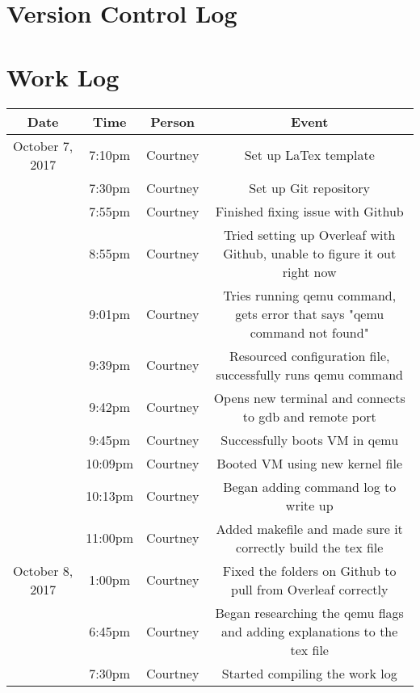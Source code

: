 \documentclass[letterpaper,10pt,draftclsnofoot,onecolumn,titlepage]{IEEEtran}
\begin{document}
\section{Version Control Log}

\section{Work Log}
\begin{center}
\begin{tabular}{ c c c c }
 Date  & Time & Person & Event \\ \hline
 October 7, 2017 & 7:10pm & Courtney & Set up LaTex template \\  
 				 & 7:30pm & Courtney & Set up Git repository \\
                 & 7:55pm & Courtney & Finished fixing issue with Github \\
                 & 8:55pm & Courtney & Tried setting up Overleaf with Github, unable to figure it out right now \\
                 & 9:01pm & Courtney & Tries running qemu command, gets error that says "qemu command not found" \\
                 & 9:39pm & Courtney & Resourced configuration file, successfully runs qemu command \\
                 & 9:42pm & Courtney & Opens new terminal and connects to gdb and remote port \\
                 & 9:45pm & Courtney & Successfully boots VM in qemu \\
                 & 10:09pm & Courtney & Booted VM using new kernel file \\
                 & 10:13pm & Courtney & Began adding command log to write up\\
                 & 11:00pm & Courtney & Added makefile and made sure it correctly build the tex file \\ \hline
 October 8, 2017 & 1:00pm & Courtney & Fixed the folders on Github to pull from Overleaf correctly \\
 				 & 6:45pm & Courtney & Began researching the qemu flags and adding explanations to the tex file \\
                 & 7:30pm & Courtney & Started compiling the work log \\
                 
\end{tabular}
\end{center}

%


	
\end{document}
